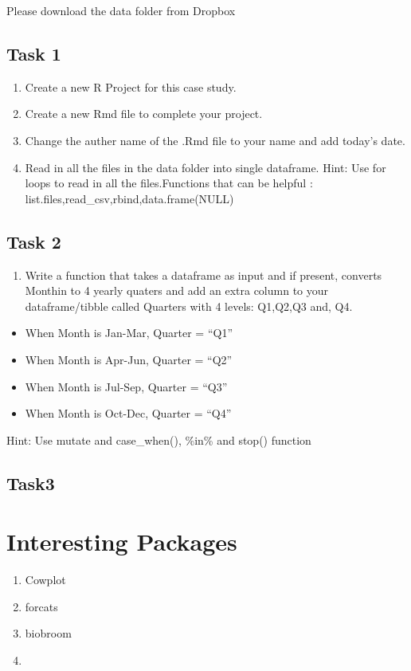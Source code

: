 \documentclass[
]{book}
\providecommand{\tightlist}{%
  \setlength{\itemsep}{0pt}\setlength{\parskip}{0pt}}
\begin{document}
Please download the data folder from Dropbox

\hypertarget{task-1}{%
\section{Task 1}\label{task-1}}

\begin{enumerate}
\def\labelenumi{\arabic{enumi}.}
\tightlist
\item
  Create a new R Project for this case study.
\item
  Create a new Rmd file to complete your project.
\item
  Change the auther name of the .Rmd file to your name and add today's date.
\item
  Read in all the files in the data folder into single dataframe. Hint: Use for loops to read in all the files.Functions that can be helpful : list.files,read\_csv,rbind,data.frame(NULL)
\end{enumerate}

\hypertarget{task-2}{%
\section{Task 2}\label{task-2}}

\begin{enumerate}
\def\labelenumi{\arabic{enumi}.}
\tightlist
\item
  Write a function that takes a dataframe as input and if present, converts Monthin to 4 yearly quaters and add an extra column to your dataframe/tibble called Quarters with 4 levels: Q1,Q2,Q3 and, Q4.
\end{enumerate}

\begin{itemize}
\tightlist
\item
  When Month is Jan-Mar, Quarter = ``Q1''
\item
  When Month is Apr-Jun, Quarter = ``Q2''
\item
  When Month is Jul-Sep, Quarter = ``Q3''
\item
  When Month is Oct-Dec, Quarter = ``Q4''
\end{itemize}

Hint: Use mutate and case\_when(), \%in\% and stop() function

\hypertarget{task3}{%
\section{Task3}\label{task3}}

\hypertarget{interesting-packages}{%
\chapter{Interesting Packages}\label{interesting-packages}}

\begin{enumerate}
\def\labelenumi{\arabic{enumi}.}
\item
  Cowplot
\item
  forcats
\item
  biobroom
\item
\end{enumerate}

  
\end{document}
